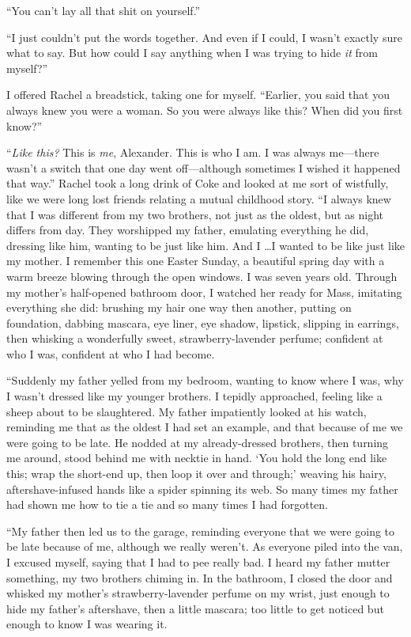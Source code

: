 ``You can't lay all that shit on yourself.''

``I just couldn't put the words together. And even if I could, I wasn't
exactly sure what to say. But how could I say anything when I was trying
to hide \emph{it} from myself?''

I offered Rachel a breadstick, taking one for myself. ``Earlier, you
said that you always knew you were a woman. So you were always like
this? When did you first know?''

``\emph{Like this?} This is \emph{me}, Alexander. This is who I am. I
was always me---there wasn't a switch that one day went off---although
sometimes I wished it happened that way.'' Rachel took a long drink of
Coke and looked at me sort of wistfully, like we were long lost friends
relating a mutual childhood story. ``I always knew that I was different
from my two brothers, not just as the oldest, but as night differs from
day. They worshipped my father, emulating everything he did, dressing
like him, wanting to be just like him. And I \ldots I wanted to be like
just like my mother. I remember this one Easter Sunday, a beautiful
spring day with a warm breeze blowing through the open windows. I was
seven years old. Through my mother's half-opened bathroom door, I
watched her ready for Mass, imitating everything she did: brushing my
hair one way then another, putting on foundation, dabbing mascara, eye
liner, eye shadow, lipstick, slipping in earrings, then whisking a
wonderfully sweet, strawberry-lavender perfume; confident at who I was,
confident at who I had become.

``Suddenly my father yelled from my bedroom, wanting to know where I was,
why I wasn't dressed like my younger brothers. I tepidly approached,
feeling like a sheep about to be slaughtered. My father impatiently
looked at his watch, reminding me that as the oldest I had set an
example, and that because of me we were going to be late. He nodded at
my already-dressed brothers, then turning me around, stood behind me
with necktie in hand. `You hold the long end like this; wrap the
short-end up, then loop it over and through;' weaving his hairy,
aftershave-infused hands like a spider spinning its web. So many times
my father had shown me how to tie a tie and so many times I had
forgotten.

``My father then led us to the garage, reminding everyone that we were
going to be late because of me, although we really weren't. As everyone
piled into the van, I excused myself, saying that I had to pee really
bad. I heard my father mutter something, my two brothers chiming in. In
the bathroom, I closed the door and whisked my mother's
strawberry-lavender perfume on my wrist, just enough to hide my father's
aftershave, then a little mascara; too little to get noticed but enough
to know I was wearing it.

